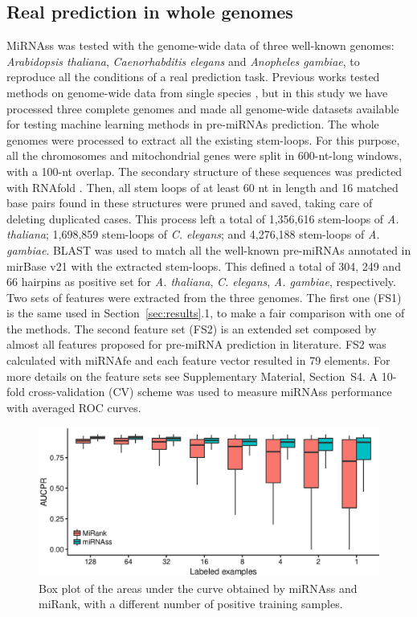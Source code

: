 \documentclass{article}
\begin{document}
\subsection{Real prediction in whole genomes} \label{sec:results:genome-wide}
MiRNAss was tested with the genome-wide data of three well-known genomes: \textit{Arabidopsis thaliana}, \textit{Caenorhabditis elegans} and \textit{Anopheles gambiae}, to reproduce all the conditions of a real prediction task. Previous works tested methods on genome-wide data from single species \citep{lai2003computational, bentwich2005identification, adai2005computational, huang2007mirfinder, billoud2014computational}, but in this study we have processed three complete genomes and made all genome-wide datasets available for testing machine learning methods in pre-miRNAs prediction.
The whole genomes were processed to extract all the existing stem-loops. For this purpose, all the chromosomes and mitochondrial genes were split in 600-nt-long windows, with a 100-nt overlap. The secondary structure of these sequences was predicted with RNAfold \citep{lorenz2011viennarna}. Then, all stem loops of at least 60 nt in length and 16 matched base pairs found in these structures were pruned and saved, taking care of deleting duplicated cases.
This process left a total of 1,356,616 stem-loops of \textit{A. thaliana}; 1,698,859 stem-loops of \textit{C. elegans}; and 4,276,188 stem-loops of \textit{A. gambiae}. BLAST \citep{camacho2009blast+} was used to match all the well-known pre-miRNAs annotated in mirBase v21 with the extracted stem-loops. This defined a total of 304, 249 and 66 hairpins as positive set for \textit{A. thaliana}, \textit{C. elegans}, \textit{A. gambiae}, respectively.
Two sets of features were extracted from the three genomes. The first one (FS1) is the same used in Section~\ref{sec:results}.1, to make a fair comparison with one of the methods. The second feature set (FS2) is an extended set composed by almost all features proposed for pre-miRNA prediction in literature. FS2 was calculated with miRNAfe \citep{yones2015mirnafe} and each feature vector resulted in 79 elements. For more details on the feature sets see Supplementary Material, Section~S4. A 10-fold cross-validation (CV) scheme was used to measure miRNAss performance with averaged ROC curves.
\begin{figure}[tpb]
	\centering
	\includegraphics[width=0.6\linewidth]{few_samples_miRank.eps}
	\caption{Box plot of the areas under the curve obtained by miRNAss and miRank, with a different number of positive training samples.}
	\label{fig:miRank}
\end{figure}
\end{document}

